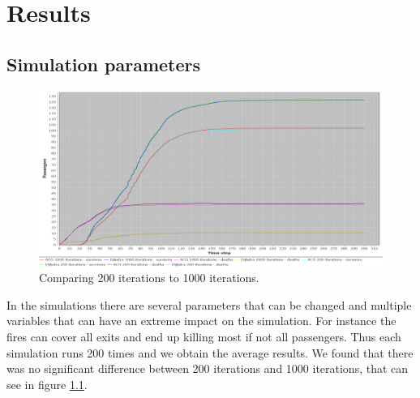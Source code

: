 \chapter{Results}
\label{ch:testing}

\section{Simulation parameters}

\begin{figure} [h]
\centering
\hspace*{-1.0in}
\includegraphics[scale=0.35]{images/Graph-using-200-rounds-and 1000-rounds.png}
\caption{Comparing 200 iterations to 1000 iterations.}
\label{fig:celeb1000}
\end{figure}

In the simulations there are several parameters that can be changed and multiple variables that can have an extreme impact on the simulation. For instance the fires can cover all exits and end up killing most if not all passengers. Thus each simulation runs 200 times and we obtain the average results. We found that there was no significant difference between 200 iterations and 1000 iterations, that can see in figure \ref{fig:celeb1000}.

